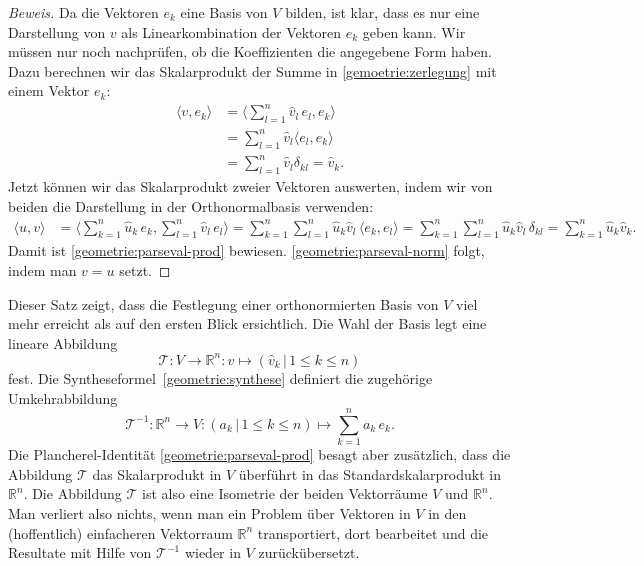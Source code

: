 \begin{proof}[Beweis]
Da die Vektoren $e_k$ eine Basis von $V$ bilden, ist klar, dass es nur
eine Darstellung von $v$ als Linearkombination der Vektoren $e_k$ geben
kann.
Wir müssen nur noch nachprüfen, ob die Koeffizienten die angegebene
Form haben.
Dazu berechnen wir das Skalarprodukt der Summe in \eqref{gemoetrie:zerlegung}
mit einem Vektor $e_k$:
\begin{align*}
\langle v,e_k\rangle
&=
\biggl\langle \sum_{l=1}^n \hat{v}_l\, e_l,e_k\biggr\rangle
\\
&=
\sum_{l=1}^n \hat{v}_l\langle e_l,e_k\rangle
\\
&=
\sum_{l=1}^n \hat{v}_l\delta_{kl}
=
\hat{v}_k.
\end{align*}
Jetzt können wir das Skalarprodukt zweier Vektoren auswerten, indem
wir von beiden die Darstellung in der Orthonormalbasis verwenden:
\begin{align*}
\langle u,v\rangle
&=
\biggl\langle
\sum_{k=1}^n \hat{u}_k\, e_k,\sum_{l=1}^n \hat{v}_l\, e_l
\biggr\rangle
=
\sum_{k=1}^n \sum_{l=1}^n \hat{u}_k\hat{v}_l\, \langle e_k,e_l\rangle
=
\sum_{k=1}^n \sum_{l=1}^n \hat{u}_k\hat{v}_l\, \delta_{kl}
=
\sum_{k=1}^n \hat{u}_k\hat{v}_k.
\end{align*}
Damit ist \eqref{geometrie:parseval-prod} bewiesen.
\eqref{geometrie:parseval-norm} folgt, indem man $v=u$ setzt.
\end{proof}

Dieser Satz zeigt, dass die Festlegung einer orthonormierten Basis von $V$
viel mehr erreicht als auf den ersten Blick ersichtlich.
Die Wahl der Basis legt eine lineare Abbildung
\[
\mathcal{T}
\colon
V\to \mathbb R^n
:
v \mapsto (\hat{v}_k\,|\, 1\le k\le n)
\]
fest.
Die Syntheseformel~\eqref{geometrie:synthese} definiert die zugehörige
Umkehrabbildung
\[
\mathcal{T}^{-1}
\colon
\mathbb R^n \to V
:
(a_k\,|\,1\le k \le n)
\mapsto
\sum_{k=1}^n a_k\,e_k.
\]
Die Plancherel-Identität
\eqref{geometrie:parseval-prod} besagt aber zusätzlich, dass
die Abbildung $\mathcal{T}$ das Skalarprodukt in $V$ überführt in
das Standardskalarprodukt in $\mathbb R^n$.
Die Abbildung $\mathcal{T}$ ist also eine Isometrie der beiden Vektorräume
$V$ und $\mathbb R^n$.
Man verliert also nichts, wenn man ein Problem über Vektoren in $V$ in
den (hoffentlich) einfacheren Vektorraum $\mathbb R^n$ transportiert,
dort bearbeitet und die Resultate mit Hilfe von $\mathcal{T}^{-1}$
wieder in $V$ zurückübersetzt.



